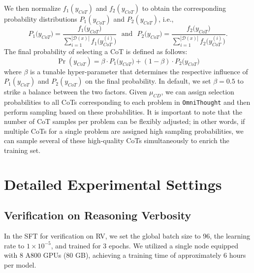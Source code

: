 \documentclass{article}
\begin{document}
We then normalize $f_1(y_{CoT})$ and $f_2(y_{CoT})$ to obtain the corresponding probability distributions $P_1(y_{CoT})$ and $P_2(y_{CoT})$, i.e.,
\begin{equation}
P_1\bigl(y_{CoT}\bigr)=
\frac{f_1\bigl(y_{CoT}\bigr)}
{\displaystyle
\sum_{i=1}^{|\mathcal{D}(x)|}
f_1\bigl(y^{(i)}_{CoT}\bigr)
} \ \ \ \text{and}\ \ \  P_2\bigl(y_{CoT}\bigr)=
\frac{f_2\bigl(y_{CoT}\bigr)}
{\displaystyle
\sum_{i=1}^{|\mathcal{D}(x)|}
f_2\bigl(y^{(i)}_{CoT}\bigr)
}. 
\end{equation}
The final probability of selecting a CoT is defined as follows: 
\begin{equation}
\Pr(y_{CoT}) = \beta\cdot P_1\bigl(y_{CoT}\bigr) + (1-\beta)\cdot P_2\bigl(y_{CoT}\bigr)
\end{equation}
where $\beta$ is a tunable hyper-parameter that determines the respective influence of $P_1(y_{CoT})$ and $P_2(y_{CoT})$ on the final probability. In default, we set $\beta=0.5$ to strike a balance between the two factors. Given $\mu_{CD}$, we can assign selection probabilities to all CoTs corresponding to each problem in \texttt{OmniThought} and then perform sampling based on these probabilities. It is important to note that the number of CoT samples per problem can be flexibly adjusted; in other words, if multiple CoTs for a single problem are assigned high sampling probabilities, we can sample several of these high-quality CoTs simultaneously to enrich the training set.


\section{Detailed Experimental Settings}

\label{sec:exp}




\subsection{Verification on Reasoning Verbosity}
In the SFT for verification on RV, we set the global batch size to 96, the learning rate to $1 \times 10^{-5}$, and trained for 3 epochs. We utilized a single node equipped with 8 A800 GPUs (80 GB), achieving a training time of approximately 6 hours per model.
\end{document}
